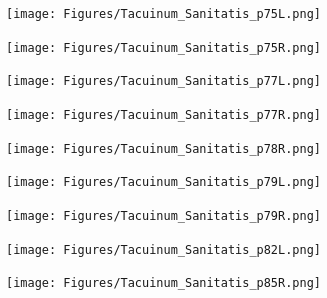 \documentclass[letterpaper,11pt,leqno]{article}
\begin{document}
\begin{figure}[!htb]
	\centering
	\texttt{[image: Figures/Tacuinum\_Sanitatis\_p75L.png]}
	\caption{\citep[page 75 Left]{TacSan}}
\end{figure}

\begin{figure}[!htb]
	\centering
	\texttt{[image: Figures/Tacuinum\_Sanitatis\_p75R.png]}
	\caption{\citep[page 75 Right]{TacSan}}
\end{figure}

\begin{figure}[!htb]
	\centering
	\texttt{[image: Figures/Tacuinum\_Sanitatis\_p77L.png]}
	\caption{\citep[page 77 Left]{TacSan}}
\end{figure}

\begin{figure}[!htb]
	\centering
	\texttt{[image: Figures/Tacuinum\_Sanitatis\_p77R.png]}
	\caption{\citep[page 77 Right]{TacSan}}
\end{figure}

\begin{figure}[!htb]
	\centering
	\texttt{[image: Figures/Tacuinum\_Sanitatis\_p78R.png]}
	\caption{\citep[page 78 Right]{TacSan}}
\end{figure}

\begin{figure}[!htb]
	\centering
	\texttt{[image: Figures/Tacuinum\_Sanitatis\_p79L.png]}
	\caption{\citep[page 79 Left]{TacSan}}
\end{figure}

\begin{figure}[!htb]
	\centering
	\texttt{[image: Figures/Tacuinum\_Sanitatis\_p79R.png]}
	\caption{\citep[page 79 Right]{TacSan}}
\end{figure}

\begin{figure}[!htb]
	\centering
	\texttt{[image: Figures/Tacuinum\_Sanitatis\_p82L.png]}
	\caption{\citep[page 82 Left]{TacSan}}
\end{figure}

\begin{figure}[!htb]
	\centering
	\texttt{[image: Figures/Tacuinum\_Sanitatis\_p85R.png]}
	\caption{\citep[page 85 Right]{TacSan}}
\end{figure}
\end{document}
